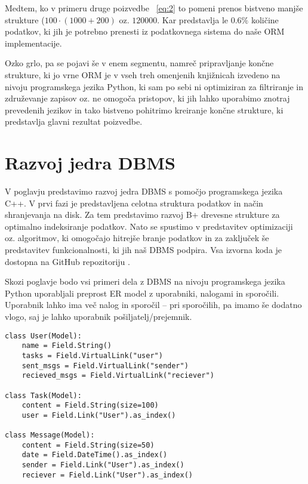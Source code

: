 \documentclass[a4paper,12pt,openright]{book}
\begin{document}
    Medtem, ko v primeru druge poizvedbe ~\eqref{eq:2} to pomeni prenos bistveno manjše strukture ($100 \cdot (1000 + 200)$ oz. $\num{120000}$. Kar predstavlja le $0.6\%$ količine podatkov, ki jih je potrebno prenesti iz podatkovnega sistema do naše ORM implementacije.

    Ozko grlo, pa se pojavi še v enem segmentu, namreč pripravljanje končne strukture, ki jo vrne ORM je v vseh treh omenjenih knjižnicah izvedeno na nivoju programskega jezika Python, ki sam po sebi ni optimiziran za filtriranje in združevanje zapisov oz. ne omogoča pristopov, ki jih lahko uporabimo znotraj prevedenih jezikov in tako bistveno pohitrimo kreiranje končne strukture, ki predstavlja glavni rezultat poizvedbe.

\chapter{Razvoj jedra DBMS}
\label{ch0}
    V poglavju predstavimo razvoj jedra DBMS s pomočjo programskega jezika C++. V prvi fazi je predstavljena celotna struktura podatkov in način shranjevanja na disk. Za tem predstavimo razvoj B+ drevesne strukture za optimalno indeksiranje podatkov. Nato se spustimo v predstavitev optimizaciji oz. algoritmov, ki omogočajo hitrejše branje podatkov in za zaključek še predstavitev funkcionalnosti, ki jih naš DBMS podpira.
    \newline
    \newline
    \noindent
    Vsa izvorna koda je dostopna na GitHub repozitoriju \cite{GRAPHENIX_GITHUB}.

    \newpage
    \noindent
    Skozi poglavje bodo vsi primeri dela z DBMS na nivoju programskega jezika Python uporabljali preprost ER model z uporabniki, nalogami in sporočili. Uporabnik lahko ima več nalog in sporočil – pri sporočilih, pa imamo še dodatno vlogo, saj je lahko uporabnik pošiljatelj/prejemnik.
\begin{verbatim}
class User(Model):
    name = Field.String()
    tasks = Field.VirtualLink("user")
    sent_msgs = Field.VirtualLink("sender")
    recieved_msgs = Field.VirtualLink("reciever")

class Task(Model):
    content = Field.String(size=100)
    user = Field.Link("User").as_index()

class Message(Model):
    content = Field.String(size=50)
    date = Field.DateTime().as_index()
    sender = Field.Link("User").as_index()
    reciever = Field.Link("User").as_index()
\end{verbatim}
    
\end{document}
